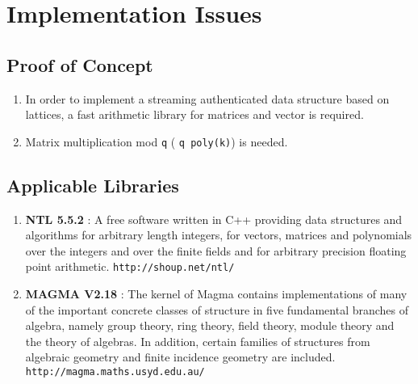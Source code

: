 \documentclass[11pt, letterpaper, oneside]{article}
\begin{document}



\section{Implementation Issues\\}
\subsection{Proof of Concept}
\begin{enumerate}
\item In order to implement a streaming authenticated data structure based on lattices, a fast
arithmetic library for matrices and vector is required.
\item Matrix multiplication mod \texttt{q} ( \texttt{q poly(k)}) is needed.
\end{enumerate}

\subsection{Applicable Libraries\\}
\begin{enumerate}
\item \textbf{NTL 5.5.2} : A free software written in C++ providing data structures and algorithms for arbitrary length
integers, for vectors, matrices and polynomials over the integers and over the finite fields and for 
arbitrary precision floating point arithmetic. \texttt{http://shoup.net/ntl/}
\item \textbf{MAGMA V2.18} : The kernel of Magma contains implementations of many of
the important concrete classes of 
structure in five fundamental branches of algebra, namely group theory, ring theory, field theory, 
module theory and the theory of algebras. In addition, certain
families of structures from algebraic 
geometry and finite incidence geometry are included. \texttt{http://magma.maths.usyd.edu.au/}
\end{enumerate}
\end{document}
